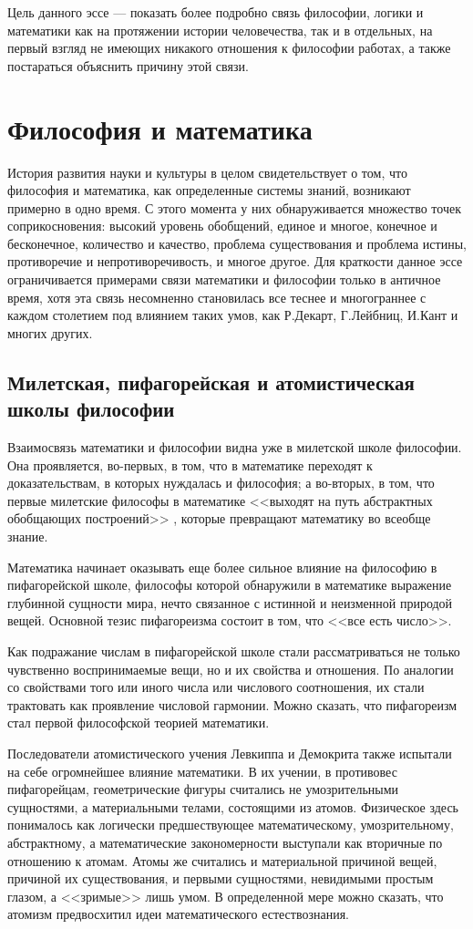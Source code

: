 \documentclass[a4page]{article}
\begin{document}
Цель данного эссе --- показать более подробно связь философии, логики и математики
как на протяжении истории человечества, так и в отдельных,
на первый взгляд не имеющих никакого отношения к философии работах,
а также постараться объяснить причину этой связи.

\section{Философия и математика}
История развития науки и культуры в целом свидетельствует о том,
что философия и математика, как определенные системы знаний,
возникают примерно в одно время.
С этого момента у них обнаруживается множество точек соприкосновения:
высокий уровень обобщений, единое и многое, конечное и бесконечное,
количество и качество, проблема существования и проблема истины,
противоречие и непротиворечивость, и многое другое.
Для краткости данное эссе ограничивается примерами связи математики и философии только в античное время,
хотя эта связь несомненно становилась все теснее и многограннее с каждом столетием под влиянием таких умов,
как Р.Декарт, Г.Лейбниц, И.Кант и многих других.

\subsection{Милетская, пифагорейская и атомистическая школы философии}
Взаимосвязь математики и философии видна уже в милетской школе философии.
Она проявляется, во-первых, в том, что в математике переходят к доказательствам,
в которых нуждалась и философия;
а во-вторых, в том, что первые милетские философы в математике
<<выходят на путь абстрактных обобщающих построений>> \cite{birth-development-of-ideas},
которые превращают математику во всеобще знание.

Математика начинает оказывать еще более сильное влияние на философию в пифагорейской школе,
философы которой обнаружили в математике выражение глубинной сущности мира,
нечто связанное с истинной и неизменной природой вещей.
Основной тезис пифагореизма состоит в том, что <<все есть число>>.

Как подражание числам в пифагорейской школе стали рассматриваться
не только чувственно воспринимаемые вещи, но и их свойства и отношения.
По аналогии со свойствами того или иного числа или числового соотношения,
их стали трактовать как проявление числовой гармонии.
Можно сказать, что пифагореизм стал первой философской теорией математики.

Последователи атомистического учения Левкиппа и Демокрита
также испытали на себе огромнейшее влияние математики.
В их учении, в противовес пифагорейцам,
геометрические фигуры считались не умозрительными сущностями,
а материальными телами, состоящими из атомов.
Физическое здесь понималось как логически предшествующее математическому,
умозрительному, абстрактному,
а математические закономерности выступали как вторичные по отношению к атомам.
Атомы же считались и материальной причиной вещей, причиной их существования,
и первыми сущностями, невидимыми простым глазом, а <<зримые>> лишь умом.
В определенной мере можно сказать, что атомизм предвосхитил идеи математического естествознания.
\end{document}
